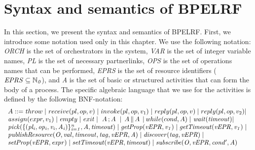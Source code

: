 \section{Syntax and semantics of BPELRF}\label{ops}
In this section, we present the syntax and semantics of BPELRF. First, we introduce some notation used only in this chapter.
We use the following notation: {\it ORCH} is the set of orchestrators in the system, {\it VAR} is the set of integer variable names, {\it PL} is the set of necessary partnerlinks, {\it OPS} is the set of operations names that can be performed, {\it EPRS} is the set of resource identifiers (${\it EPRS\subseteq\mathbb{N}_{0}}$), and {\it A} is the set of basic or structured activities that can form the body of a process. The specific algebraic language that we use
for the activities is defined by the following BNF-notation:
%
\[\begin{array}{l}
  A ::=  {\mathit throw} \;|\;           %
         {\mathit receive(pl,op,v)} \;|\;  %
         {\mathit invoke(pl,op,v_1)} \;|\;
         {\mathit reply(pl,op,v)}\;|\;  %
         {\mathit \overline{reply(pl,op,v_2)}}\hspace{-0.1cm}\;|\;\\
         {\mathit assign(expr,v_1)} \;|\;
         {\mathit empty}\;|\;
         {\mathit exit}\;|\;
         \,\,A \,; A \,\, \;|\, %
         \;A \,\| \, A \;\,|\,   %
         {\mathit while(cond,A)}\;|\ 
         {\it wait(timeout)}\hspace{-0.1cm}\;|\;\\
         {\it pick(\{(pl_i,op_i,v_i,A_i)\}_{i=1}^n,A,timeout)}\;|\;
         {\it getProp(vEPR,v_1)}\;|\;
         {\it getTimeout(vEPR,v_1)}\;|\;\\
         {\it publishResource(O,val,timeout,tag,vEPR,A)}\;|\;
         {\it discover(tag,vEPR)}\;|\;\\
         {\it setProp(vEPR,expr)}\;|\;
         {\it setTimeout(vEPR,timeout)}\;|\;
         {\it subscribe(O,vEPR,cond',A)}
\end{array}
\]

